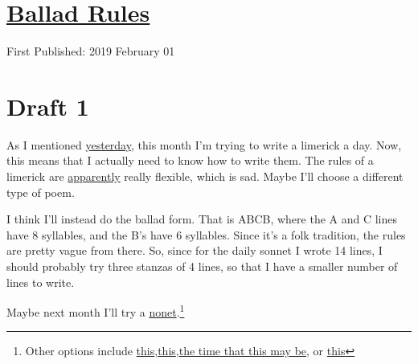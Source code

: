 \documentclass[12pt]{article}[titlepage]
\newcommand{\1}{\={a}}
\newcommand{\2}{\={e}}
\newcommand{\3}{\={\i}}
\newcommand{\4}{\=o}
\newcommand{\5}{\=u}
\newcommand{\6}{\={A}}
\renewcommand{\,}{\textsuperscript{,}}
\begin{document}
\doublespacing
\section{\href{ballad-rules.html}{Ballad Rules}}
First Published: 2019 February 01
\section{Draft 1}
As I mentioned \href{reflection-january-19.html}{yesterday}, this month I'm trying to write a limerick a day.
Now, this means that I actually need to know how to write them.
The rules of a limerick are \href{https://en.wikipedia.org/wiki/Limerick_(poetry)}{apparently} really flexible, which is sad.
Maybe I'll choose a different type of poem.

I think I'll instead do the ballad form.
That is ABCB, where the A and C lines have 8 syllables, and the B's have 6 syllables.
Since it's a folk tradition, the rules are pretty vague from there.
So, since for the daily sonnet I wrote 14 lines, I should probably try three stanzas of 4 lines, so that I have a smaller number of lines to write.

Maybe next month I'll try a \href{http://www.poetrydances.com/nonet.php}{nonet}.\footnote{Other options include \href{http://www.shadowpoetry.com/resources/wip/rondel.html}{this},\href{http://bensonofjohn.co.uk/poetry/formssearch.php?searchbox=Roundel}{this},\href{https://www.poetryfoundation.org/poetrymagazine/poems/32637/triolet}{the time that this may be}, or \href{https://www.poetryfoundation.org/learn/glossary-terms/villanelle}{this}}
\end{document}
